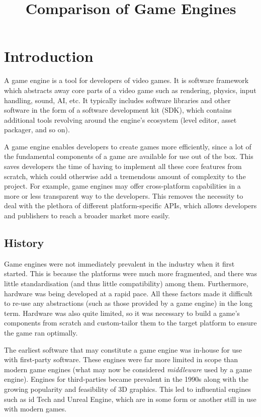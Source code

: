 \documentclass[a4paper, 12pt]{scrartcl}
\title{Comparison of Game Engines}
\begin{document}
\maketitle

\section{Introduction}
A game engine is a tool for developers of video games. It is software framework which abstracts away core parts of a video game such as rendering, physics, input handling, sound, AI, etc. It typically includes software libraries and other software in the form of a software development kit (SDK), which contains additional tools revolving around the engine's ecosystem (level editor, asset packager, and so on).

A game engine enables developers to create games more efficiently, since a lot of the fundamental components of a game are available for use out of the box. This saves developers the time of having to implement all these core features from scratch, which could otherwise add a tremendous amount of complexity to the project. For example, game engines may offer cross-platform capabilities in a more or less transparent way to the developers. This removes the necessity to deal with the plethora of different platform-specific APIs, which allows developers and publishers to reach a broader market more easily.

\subsection{History}
Game engines were not immediately prevalent in the industry when it first started. This is because the platforms were much more fragmented, and there was little standardisation (and thus little compatibility) among them. Furthermore, hardware was being developed at a rapid pace. All these factors made it difficult to re-use any abstractions (such as those provided by a game engine) in the long term. Hardware was also quite limited, so it was necessary to build a game's components from scratch and custom-tailor them to the target platform to ensure the game ran optimally.

The earliest software that may constitute a game engine was in-house for use with first-party software. These engines were far more limited in scope than modern game engines (what may now be considered \textit{middleware} used by a game engine). Engines for third-parties became prevalent in the 1990s along with the growing popularity and feasibility of 3D graphics. This led to influential engines such as id Tech and Unreal Engine, which are in some form or another still in use with modern games.
\end{document}
